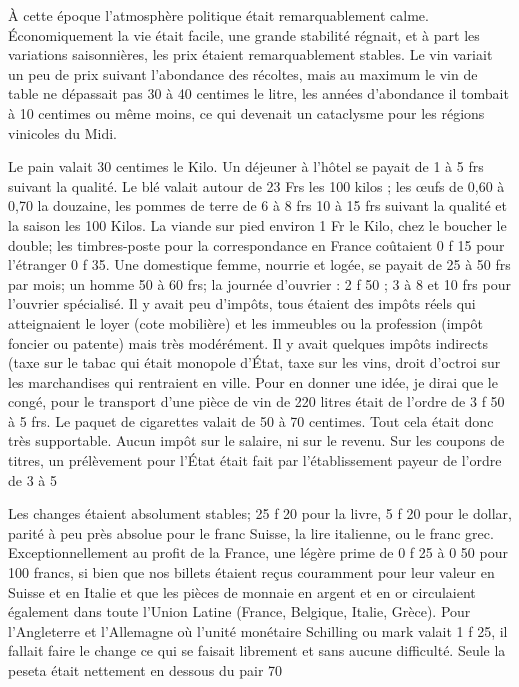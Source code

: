 \documentclass[11pt,a4paper]{report}
\begin{document}
À cette époque l'atmosphère politique était remarquablement calme. Économiquement la vie était facile, une grande stabilité régnait, et à part les variations saisonnières, les prix étaient remarquablement stables. Le vin variait un peu de prix suivant l'abondance des récoltes, mais au maximum le vin de table ne dépassait pas 30 à 40 centimes le litre, les années d'abondance il tombait à 10 centimes ou même moins, ce qui devenait un cataclysme pour les régions vinicoles du Midi.

Le pain valait 30 centimes le Kilo. Un déjeuner à l'hôtel se payait de 1 à 5 frs suivant la qualité. Le blé valait autour de 23 Frs les 100 kilos ; les œufs de 0,60 à 0,70 la douzaine, les pommes de terre de 6 à 8 frs 10 à 15 frs suivant la qualité et la saison les 100 Kilos. La viande sur pied environ 1 Fr le Kilo, chez le boucher le double; les timbres-poste pour la correspondance en France coûtaient 0 f 15 pour l'étranger 0 f 35. Une domestique femme, nourrie et logée, se payait de 25 à 50 frs par mois; un homme 50 à 60 frs; la journée d'ouvrier : 2 f 50 ; 3 à 8 et 10 frs pour l'ouvrier spécialisé. Il y avait peu d'impôts, tous étaient des impôts réels qui atteignaient le loyer (cote mobilière) et les immeubles ou la profession (impôt foncier ou patente) mais très modérément. Il y avait quelques impôts indirects (taxe sur le tabac qui était monopole d'État, taxe sur les vins, droit d'octroi sur les marchandises qui rentraient en ville. Pour en donner une idée, je dirai que le congé, pour le transport d'une pièce de vin de 220 litres était de l'ordre de 3 f 50 à 5 frs. Le paquet de cigarettes valait de 50 à 70 centimes. Tout cela était donc très supportable. Aucun impôt sur le salaire, ni sur le revenu. Sur les coupons de titres, un prélèvement pour l'État était fait par l'établissement payeur de l'ordre de 3 à 5 %

Les changes étaient absolument stables; 25 f 20 pour la livre, 5 f 20 pour le dollar, parité à peu près absolue pour le franc Suisse, la lire italienne, ou le franc grec. Exceptionnellement au profit de la France, une légère prime de 0 f 25 à 0 50 pour 100 francs, si bien que nos billets étaient reçus couramment pour leur valeur en Suisse et en Italie et que les pièces de monnaie en argent et en or circulaient également dans toute l'Union Latine (France, Belgique, Italie, Grèce). Pour l'Angleterre et l'Allemagne où l'unité monétaire Schilling ou mark valait 1 f 25, il fallait faire le change ce qui se faisait librement et sans aucune difficulté. Seule la peseta était nettement en dessous du pair 70 %
\end{document}
